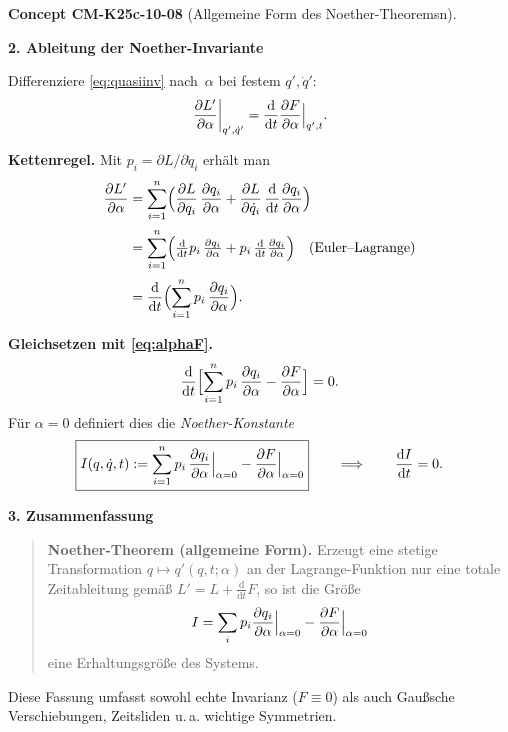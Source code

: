 \documentclass[10pt, letterpaper]{article}
\newcommand{\CustomHeading}[3]{%
  \par\medskip\noindent%
  \textbf{#1 #2} \textnormal{(#3)}.\enskip%
}
\newenvironment{CONC}[2]{\begin{unitbox}\CustomHeading{Concept}{#1}{#2}}{\end{unitbox}}
\begin{document}
\begin{CONC}{CM-K25c-10-08}{Allgemeine Form des Noether-Theoremsn}
\textbf{2. Ableitung der Noether-Invariante}

Differenziere \eqref{eq:quasiinv} nach~\(\alpha\) bei festem
\(q',\dot q'\):
\begin{equation}
  \left.
    \frac{\partial L'}{\partial\alpha}
  \right|_{q',\dot q'}
  =
  \frac{\mathrm d}{\mathrm dt}
  \Bigl.
    \frac{\partial F}{\partial\alpha}
  \Bigr|_{q',t}.
  \label{eq:alphaF}
\end{equation}

\textbf{Kettenregel.}
Mit
\(p_i=\partial L/\partial\dot q_i\) erhält man
\[
\begin{aligned}
  \frac{\partial L'}{\partial\alpha}
  &=\sum_{i=1}^{n}
     \Bigl(
       \frac{\partial L}{\partial q_i}\,
       \frac{\partial q_i}{\partial\alpha}
      +\frac{\partial L}{\partial\dot q_i}\,
       \frac{\mathrm d}{\mathrm dt}
         \frac{\partial q_i}{\partial\alpha}
     \Bigr) \\[2pt]
  &=\sum_{i=1}^{n}
     \Bigl(
       \tfrac{\mathrm d}{\mathrm dt}p_i\,
       \tfrac{\partial q_i}{\partial\alpha}
      +p_i\,
       \tfrac{\mathrm d}{\mathrm dt}
         \tfrac{\partial q_i}{\partial\alpha}
     \Bigr)  \quad\text{(Euler–Lagrange)}\\[2pt]
  &=\frac{\mathrm d}{\mathrm dt}
     \Bigl(
       \sum_{i=1}^{n}p_i\,
       \frac{\partial q_i}{\partial\alpha}
     \Bigr).
\end{aligned}
\]

\textbf{Gleichsetzen mit \eqref{eq:alphaF}.}
\[
  \frac{\mathrm d}{\mathrm dt}
  \Bigl[
    \sum_{i=1}^{n}p_i\,
      \frac{\partial q_i}{\partial\alpha}
    -\frac{\partial F}{\partial\alpha}
  \Bigr]
  =0 .
\]
Für \(\alpha=0\) definiert dies die \emph{Noether-Konstante}
\[
  \boxed{%
    I(q,\dot q,t)
    :=\sum_{i=1}^{n}
        p_i\,
        \Bigl.\frac{\partial q_i}{\partial\alpha}\Bigr|_{\alpha=0}
       -\Bigl.\frac{\partial F}{\partial\alpha}\Bigr|_{\alpha=0}}
  \qquad\Longrightarrow\qquad
  \frac{\mathrm dI}{\mathrm dt}=0 .
\]

\textbf{3. Zusammenfassung}

\begin{quote}
\textbf{Noether-Theorem (allgemeine Form).}\;
Erzeugt eine stetige Transformation
\( q\mapsto q'(q,t;\alpha) \)
an der Lagrange-Funktion nur eine totale Zeitableitung gemäß
\(
 L'\!=\!L+\tfrac{\mathrm d}{\mathrm dt}F
\),
so ist die Größe
\[
  I
  =\sum_{i}p_i
     \Bigl.\frac{\partial q_i}{\partial\alpha}\Bigr|_{\alpha=0}
   -\Bigl.\frac{\partial F}{\partial\alpha}\Bigr|_{\alpha=0}
\]
eine Erhaltungsgröße des Systems.
\end{quote}

Diese Fassung umfasst sowohl echte Invarianz
(\(F\equiv 0\)) als auch Gaußsche Verschiebungen, Zeitsliden
u.\,a. wichtige Symmetrien.
\end{CONC}
\end{document}
